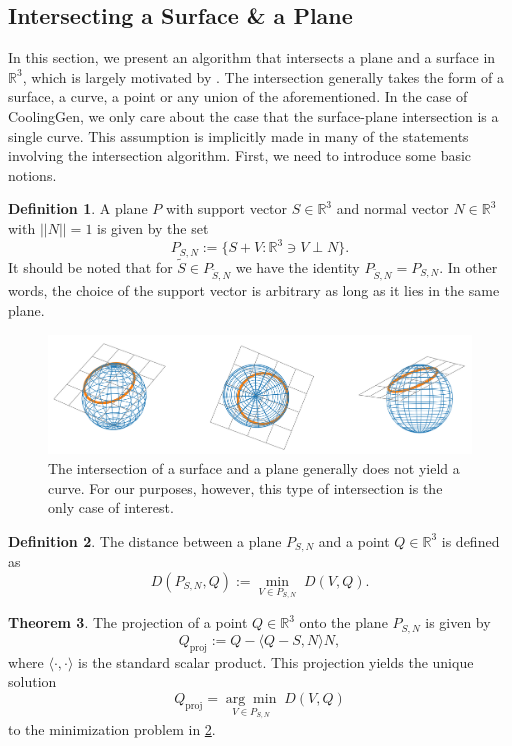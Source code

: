 \documentclass[a4paper, 11pt]{report}
\theoremstyle{definition}
\newtheorem{definition}{Definition}[section]
\newtheorem{theorem}[definition]{Theorem}
\begin{document}
\subsection{Intersecting a Surface \& a Plane}\label{sec:surfaceplaneintersection}
	In this section, we present an algorithm that intersects a plane and a surface in $\mathbb{R}^3$, which is largely motivated by \cite{Barnhill1990}. The intersection generally takes the form of a surface, a curve, a point or any union of the aforementioned. In the case of CoolingGen, we only care about the case that the surface-plane intersection is a single curve. This assumption is implicitly made in many of the statements involving the intersection algorithm. First, we need to introduce some basic notions.

	\begin{definition}
		A plane $P$ with support vector $S \in \mathbb{R}^3$ and normal vector $N \in \mathbb{R}^3$ with $||N|| = 1$ is given by the set
			$$ P_{S,N} := \{S+V : \mathbb{R}^3 \ni V \perp N\}. $$
		It should be noted that for $\tilde S \in P_{\tilde S, N}$ we have the identity $P_{\tilde S, N} = P_{S, N}$. In other words, the choice of the support vector is arbitrary as long as it lies in the same plane.
	\end{definition}

	\begin{figure}[H]
		\centering
		\includegraphics[width=\textwidth]{../python/surfacePlaneIntersection1_cropped.png}
		\caption{The intersection of a surface and a plane generally does not yield a curve. For our purposes, however, this type of intersection is the only case of interest.}
		\label{fig:planeintersectionexample}
	\end{figure}

	\begin{definition}\label{def:distanceplane}
		The distance between a plane $P_{S,N}$ and a point $Q \in \mathbb{R}^3$ is defined as
			$$ D(P_{S,N}, Q) := \underset{V \in P_{S,N}}{\min} \; D(V, Q). $$
	\end{definition}

	\begin{theorem}\label{thm:planeprojection}
		The projection of a point $Q \in \mathbb{R}^3$ onto the plane $P_{S,N}$ is given by
			$$Q_\textrm{proj} := Q - \langle Q - S, N \rangle N,$$
		where $\langle \cdot,\cdot \rangle$ is the standard scalar product. This projection yields the unique solution
			$$ Q_\textrm{proj} = \underset{V \in P_{S,N}}{\arg\min} \; D(V, Q) $$
		to the minimization problem in \ref{def:distanceplane}.
	\end{theorem}
\end{document}
